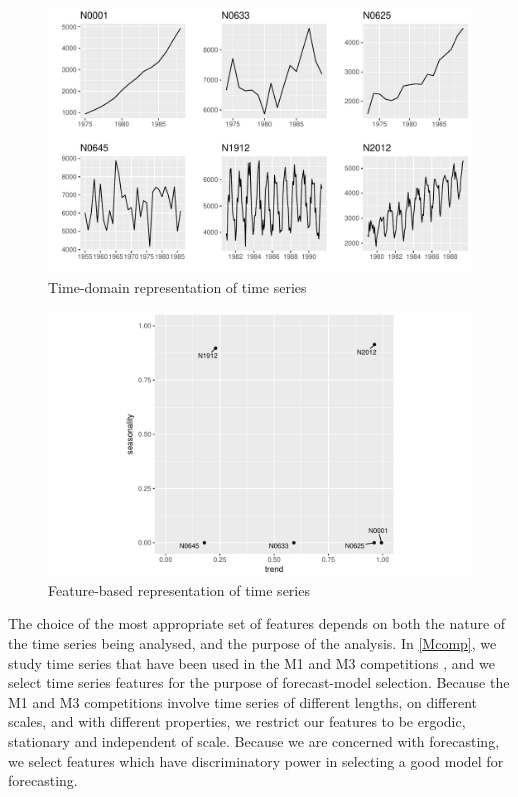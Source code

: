 \documentclass[11pt,a4paper,]{article}
\theoremstyle{definition}
\theoremstyle{definition}
\theoremstyle{definition}
\theoremstyle{remark}
\begin{document}
\begin{figure}

{\centering \includegraphics[width=\textwidth]{figure/fig1-1} 

}

\caption{Time-domain representation of time series}\label{fig:fig1}
\end{figure}

\begin{figure}

{\centering \includegraphics[width=0.7\linewidth]{figure/fig2-1} 

}

\caption{Feature-based representation of time series}\label{fig:fig2}
\end{figure}

The choice of the most appropriate set of features depends on both the
nature of the time series being analysed, and the purpose of the
analysis. In \autoref{Mcomp}, we study time series that have been used
in the M1 and M3 competitions
\autocites{makridakis1982accuracy}{makridakis2000m3}, and we select time
series features for the purpose of forecast-model selection. Because the
M1 and M3 competitions involve time series of different lengths, on
different scales, and with different properties, we restrict our
features to be ergodic, stationary and independent of scale. Because we
are concerned with forecasting, we select features which have
discriminatory power in selecting a good model for forecasting.
\end{document}
